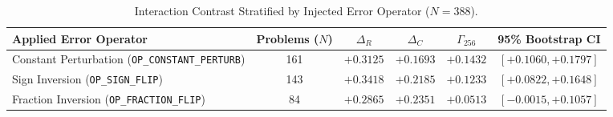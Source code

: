 \begin{table}[t]
\centering
\caption{Interaction Contrast Stratified by Injected Error Operator ($N=388$).}
\label{tab:operators}
\begin{tabular}{lccccc}
\toprule
Applied Error Operator & Problems ($N$) & $\Delta_R$ & $\Delta_C$ & $\Gamma_{256}$ & 95\% Bootstrap CI \\
\midrule
Constant Perturbation (\texttt{OP\_CONSTANT\_PERTURB}) & 161 & $+0.3125$ & $+0.1693$ & \textbf{$+0.1432$} & $[+0.1060, +0.1797]$ \\
Sign Inversion (\texttt{OP\_SIGN\_FLIP})            & 143 & $+0.3418$ & $+0.2185$ & \textbf{$+0.1233$} & $[+0.0822, +0.1648]$ \\
Fraction Inversion (\texttt{OP\_FRACTION\_FLIP})     & 84  & $+0.2865$ & $+0.2351$ & \textbf{$+0.0513$} & $[-0.0015, +0.1057]$ \\
\bottomrule
\end{tabular}
\end{table}
